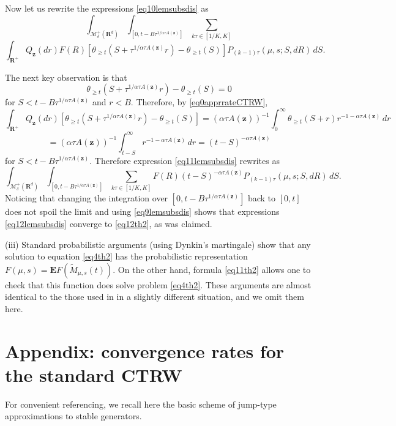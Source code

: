 \documentclass[12pt]{article}
\def\MC{\mathcal{M}}
\def\E{\mathbf{E}}
\def\R{\mathbf{R}}
\def\z{\mathbf{z}}
\def\al{\alpha}
\numberwithin{equation}{section}
\begin{document}
Now let us rewrite the expressions \eqref{eq10lemsubsdis}  as
\[
 \int_{\MC^+_{\delta}(\R^d)} \int_{[0,t-B\tau^{1/\al \tau A(\z)}]}  \sum_{k \tau \in  [1/K,K]}
 \]
 \begin{equation}
 \label{eq11lemsubsdis}
 \int_{\R^+} Q_{\z}(dr)
F(R) [\theta_{\ge t}( S+\tau^{1/\al \tau A(\z)}r)-\theta_{\ge t}( S)]
 P_{(k-1)\tau}(\mu,s; S, dR)\, dS.
\end{equation}

The next key observation is that
\[
\theta_{\ge t}( S+\tau^{1/\al \tau A(\z)}r)-\theta_{\ge t}( S)=0
\]
for $S< t-B\tau^{1/\al \tau A(\z)}$ and $r<B$. Therefore, by \eqref{eq0apprrateCTRW},
\[
\int_{\R^+} Q_{\z}(dr)
[\theta_{\ge t}( S+\tau^{1/\al \tau A(\z)}r)-\theta_{\ge t}( S)]=
(\al \tau A(\z))^{-1}\int_0^{\infty} \theta_{\ge t}(S+r) r^{-1-\al \tau A(\z)} \, dr
\]
\[
=(\al \tau A(\z))^{-1}\int_{t-S}^{\infty} r^{-1-\al \tau A(\z)} \, dr
=(t-S)^{-\al \tau A(\z)}
\]
for $S< t-B\tau^{1/\al \tau A(\z)}$. Therefore expression \eqref{eq11lemsubsdis} rewrites as
\begin{equation}
 \label{eq12lemsubsdis}
 \int_{\MC^+_{\delta}(\R^d)} \int_{[0,t-B\tau^{1/\al \tau A(\z)}]}  \sum_{k \tau \in  [1/K,K]}
F(R) (t-S)^{-\al \tau A(\z)}
 P_{(k-1)\tau}(\mu,s; S, dR)\, dS.
\end{equation}
Noticing that changing the integration over  $[0,t-B\tau^{1/\al \tau A(\z)}]$ back to $[0,t]$
does not spoil the limit and using \eqref{eq9lemsubsdis} shows that expressions \eqref{eq12lemsubsdis}
converge to \eqref{eq12th2}, as was claimed.

(iii) Standard probabilistic arguments (using Dynkin's martingale) show that
any solution to equation \eqref{eq4th2} has the probabilistic representation $F(\mu,s)=\E F(\tilde M_{\mu,s}(t))$.
On the other hand, formula \eqref{eq11th2} allows one to check that this function does solve
problem \eqref{eq4th2}. These arguments are almost identical to the those used in \cite{Ko22} in a slightly
different situation, and we omit them here.

\section{Appendix: convergence rates for the standard CTRW}
\label{append}

For convenient referencing, we recall here the basic scheme of
jump-type approximations to stable generators.
\end{document}
